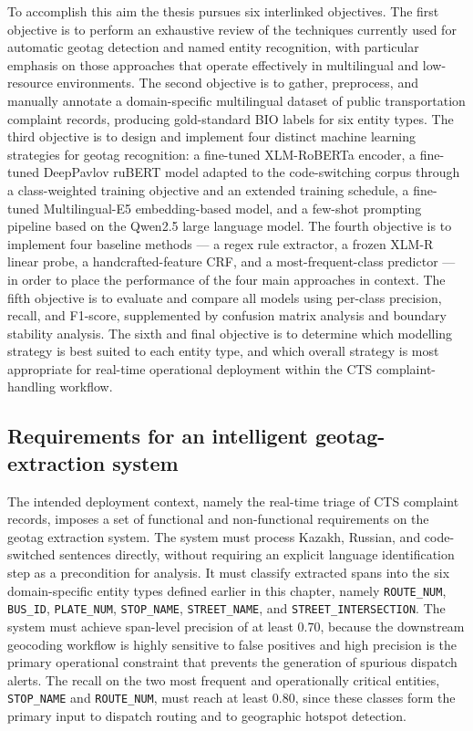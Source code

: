 To accomplish this aim the thesis pursues six interlinked objectives. The first objective is to perform an exhaustive review of the techniques currently used for automatic geotag detection and named entity recognition, with particular emphasis on those approaches that operate effectively in multilingual and low-resource environments. The second objective is to gather, preprocess, and manually annotate a domain-specific multilingual dataset of public transportation complaint records, producing gold-standard BIO labels for six entity types. The third objective is to design and implement four distinct machine learning strategies for geotag recognition: a fine-tuned XLM-RoBERTa encoder, a fine-tuned DeepPavlov ruBERT model adapted to the code-switching corpus through a class-weighted training objective and an extended training schedule, a fine-tuned Multilingual-E5 embedding-based model, and a few-shot prompting pipeline based on the Qwen2.5 large language model. The fourth objective is to implement four baseline methods --- a regex rule extractor, a frozen XLM-R linear probe, a handcrafted-feature CRF, and a most-frequent-class predictor --- in order to place the performance of the four main approaches in context. The fifth objective is to evaluate and compare all models using per-class precision, recall, and F1-score, supplemented by confusion matrix analysis and boundary stability analysis. The sixth and final objective is to determine which modelling strategy is best suited to each entity type, and which overall strategy is most appropriate for real-time operational deployment within the CTS complaint-handling workflow.

\subsection{Requirements for an intelligent geotag-extraction system}
\label{sec:requirements}

The intended deployment context, namely the real-time triage of CTS complaint records, imposes a set of functional and non-functional requirements on the geotag extraction system. The system must process Kazakh, Russian, and code-switched sentences directly, without requiring an explicit language identification step as a precondition for analysis. It must classify extracted spans into the six domain-specific entity types defined earlier in this chapter, namely \texttt{ROUTE\_NUM}, \texttt{BUS\_ID}, \texttt{PLATE\_NUM}, \texttt{STOP\_NAME}, \texttt{STREET\_NAME}, and \texttt{STREET\_INTERSECTION}. The system must achieve span-level precision of at least $0.70$, because the downstream geocoding workflow is highly sensitive to false positives and high precision is the primary operational constraint that prevents the generation of spurious dispatch alerts. The recall on the two most frequent and operationally critical entities, \texttt{STOP\_NAME} and \texttt{ROUTE\_NUM}, must reach at least $0.80$, since these classes form the primary input to dispatch routing and to geographic hotspot detection.


